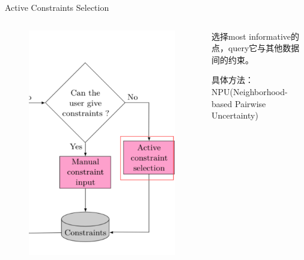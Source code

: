 \documentclass{beamer}
\begin{document}
\begin{frame}{Active Constraints Selection}
    
    \begin{columns}
        \begin{column}{0.5\textwidth}
            \begin{figure}[htpb]
                \begin{center}
                    \includegraphics[width=0.8\linewidth]{./images/selection.png}
                \end{center}
            \end{figure}
        \end{column}     
        \begin{column}{0.48\textwidth}
            选择most informative的点，query它与其他数据间的约束。

            具体方法：NPU(Neighborhood-based Pairwise Uncertainty)



        \end{column}
    \end{columns}
\end{frame}
\end{document}
